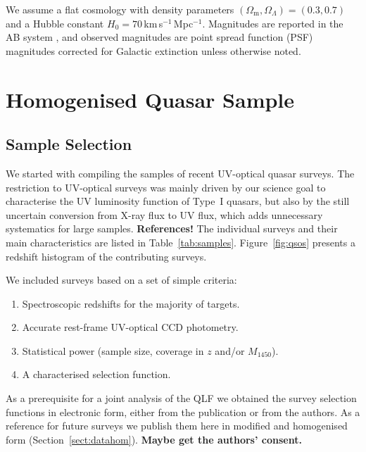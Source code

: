 \documentclass[a4paper,fleqn,usenatbib]{mnras}
\begin{document}
We assume a flat cosmology with density parameters
$\left(\Omega_\mathrm{m},\Omega_\Lambda\right)=\left(0.3,0.7\right)$
and a Hubble constant $H_0=70$\,km\,s$^{-1}$\,Mpc$^{-1}$. Magnitudes
are reported in the AB system \citep{1983ApJ...266..713O}, and
observed magnitudes are point spread function (PSF) magnitudes
\citep{2002AJ....123..485S} corrected for Galactic extinction
\citep{1998ApJ...500..525S} unless otherwise noted.


\section{Homogenised Quasar Sample}

\subsection{Sample Selection}

We started with compiling the samples of recent UV-optical quasar
surveys. The restriction to UV-optical surveys was mainly driven by
our science goal to characterise the UV luminosity function of Type~I
quasars, but also by the still uncertain conversion from X-ray flux to
UV flux, which adds unnecessary systematics for large
samples. \textbf{References!} The individual surveys and their main
characteristics are listed in
Table~\ref{tab:samples}. Figure~\ref{fig:qsos} presents a redshift
histogram of the contributing surveys.

We included surveys based on a set of simple criteria:
\begin{enumerate}
\item Spectroscopic redshifts for the majority of targets.
\item Accurate rest-frame UV-optical CCD photometry.
\item Statistical power (sample size, coverage in $z$ and/or $M_{1450}$).
\item A characterised selection function.
\end{enumerate}
As a prerequisite for a joint analysis of the QLF we obtained the
survey selection functions in electronic form, either from the
publication or from the authors. As a reference for future surveys we
publish them here in modified and homogenised form
(Section~\ref{sect:datahom}). \textbf{Maybe get the authors' consent.}
\end{document}
